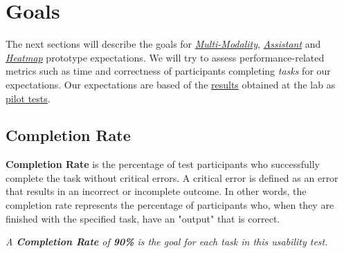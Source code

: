 
\section{Goals}
\label{sec:sec009}

The next sections will describe the goals for {\it \hyperlink{https://github.com/mida-project/prototype-multi-modality}{Multi-Modality}}, {\it \hyperlink{https://github.com/mida-project/prototype-multi-modality-assistant}{Assistant}} and {\it \hyperlink{https://github.com/mida-project/prototype-heatmap}{Heatmap}} prototype expectations. We will try to assess performance-related metrics such as time and correctness of participants completing \textit{tasks} for our expectations. Our expectations are based of the \hyperlink{https://docs.google.com/spreadsheets/d/1WwbvDO5Iz39Jr6H2ZzPth1o9DqhmpQz10Vtao7rvjfQ/edit?usp=sharing}{results} obtained at the lab as \hyperlink{https://www.nngroup.com/articles/pilot-testing/}{pilot tests}.


\subsection{Completion Rate}

\textbf{Completion Rate} is the percentage of test participants who successfully complete the task without critical errors. A critical error is defined as an error that results in an incorrect or incomplete outcome. In other words, the completion rate represents the percentage of participants who, when they are finished with the specified task, have an "output" that is correct.


\hfill

\textit{A \textbf{Completion Rate} of \textbf{90\%} is the goal for each task in this usability test.}

\hfill


